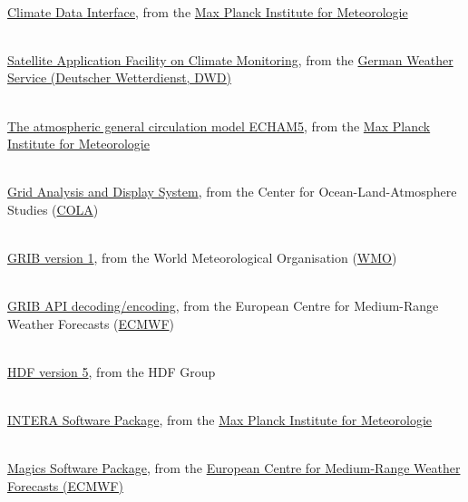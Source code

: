 \begin{thebibliography}{xx}


 \ \\
  \href{https://code.zmaw.de/projects/cdi}
       {Climate Data Interface},
  from the
  \href{http://www.mpimet.mpg.de}
       {Max Planck Institute for Meteorologie}


 \ \\
  \href{http://www.cmsaf.eu}
       {Satellite Application Facility on Climate Monitoring},
  from the
  \href{http://www.dwd.de}
       {German Weather Service (Deutscher Wetterdienst, DWD)}


 \ \\
  \href{http://www.mpimet.mpg.de/wissenschaft/publikationen/reports.html}
       {The atmospheric general circulation model ECHAM5},
  from the
  \href{http://www.mpimet.mpg.de}
       {Max Planck Institute for Meteorologie}


 \ \\
  \href{http://www.iges.org/grads/}
       {Grid Analysis and Display System},
  from the Center for Ocean-Land-Atmosphere Studies
  (\href{http://www.iges.org/cola.html}{COLA})


 \ \\
  \href{http://www.wmo.ch/web/www/WMOCodes/Guides/GRIB/GRIB1-Contents.html}
       {GRIB version 1},
  from the World Meteorological Organisation
  (\href{http://www.wmo.ch}{WMO})


 \ \\
  \href{https://software.ecmwf.int/wiki/display/GRIB/Home}
       {GRIB API decoding/encoding},
  from the European Centre for Medium-Range Weather Forecasts
  (\href{http://www.ecmwf.int}{ECMWF})


 \ \\
  \href{https://www.hdfgroup.org/HDF5}
       {HDF version 5},
  from the HDF Group


 \ \\
  \href{http://wekuw.met.fu-berlin.de/~IngoKirchner/nudging/nudging}{INTERA Software Package},
  from the
  \href{http://www.mpimet.mpg.de}
       {Max Planck Institute for Meteorologie}


 \ \\
  \href{https://software.ecmwf.int/wiki/display/MAGP/Magics}
       {Magics Software Package},
  from the
  \href{https://www.ecmwf.int}
       {European Centre for Medium-Range Weather Forecasts (ECMWF)}


\end{thebibliography}
